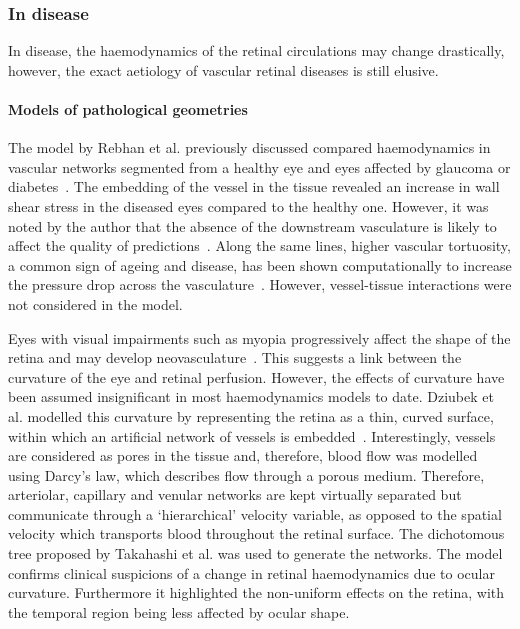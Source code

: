 \documentclass{article}
\begin{document}
\subsubsection{In disease}

In disease, the haemodynamics of the retinal circulations may change drastically, however, the exact aetiology of vascular retinal diseases is still elusive.

\paragraph*{Models of pathological geometries} 

The model by Rebhan et al. previously discussed compared haemodynamics in vascular networks segmented from a healthy eye and eyes affected by glaucoma or diabetes~\cite{Rebhan_2019}.
The embedding of the vessel in the tissue revealed an increase in wall shear stress in the diseased eyes compared to the healthy one.
However, it was noted by the author that the absence of the downstream vasculature is likely to affect the quality of predictions~\cite{Rebhan_2019}.
Along the same lines, higher vascular tortuosity, a common sign of ageing and disease, has been shown computationally to increase the pressure drop across the vasculature~\cite{Malek_2014}.
However, vessel-tissue interactions were not considered in the model.

Eyes with visual impairments such as myopia progressively affect the shape of the retina and may develop neovasculature~\cite{Medina_2016}.
This suggests a link between the curvature of the eye and retinal perfusion.
However, the effects of curvature have been assumed insignificant in most haemodynamics models to date.
Dziubek et al. modelled this curvature by representing the retina as a thin, curved surface, within which an artificial network of vessels is embedded~\cite{Dziubek_2015}.
Interestingly, vessels are considered as pores in the tissue and, therefore, blood flow was modelled using Darcy's law, which describes flow through a porous medium.
Therefore, arteriolar, capillary and venular networks are kept virtually separated but communicate through a `hierarchical' velocity variable, as opposed to the spatial velocity which transports blood throughout the retinal surface.
The dichotomous tree proposed by Takahashi et al. was used to generate the networks.
The model confirms clinical suspicions of a change in retinal haemodynamics due to ocular curvature.
Furthermore it highlighted the non-uniform effects on the retina, with the temporal region being less affected by ocular shape\cite{Dziubek_2015}.
\end{document}
